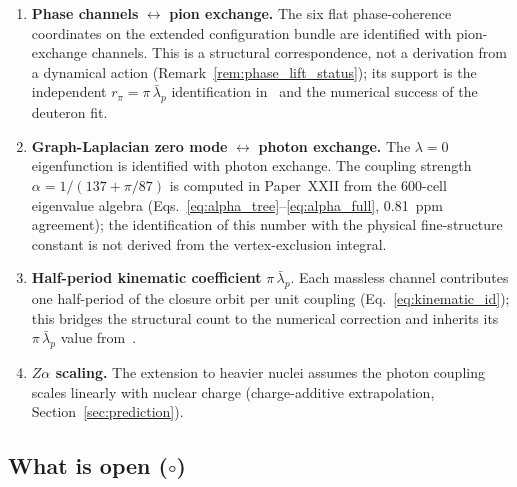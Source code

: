 \documentclass[12pt]{article}
\newcommand{\lbar}{\bar{\lambda}}
\begin{document}
\begin{enumerate}
    \item \textbf{Phase channels} $\leftrightarrow$ \textbf{pion exchange.} The six flat phase-coherence coordinates on the extended configuration bundle are identified with pion-exchange channels. This is a structural correspondence, not a derivation from a dynamical action (Remark~\ref{rem:phase_lift_status}); its support is the independent $r_\pi = \pi\,\lbar_p$ identification in~\citep{SmartRadius} and the numerical success of the deuteron fit.
    \item \textbf{Graph-Laplacian zero mode} $\leftrightarrow$ \textbf{photon exchange.} The $\lambda = 0$ eigenfunction is identified with photon exchange. The coupling strength $\alpha = 1/(137 + \pi/87)$ is computed in Paper~XXII from the 600-cell eigenvalue algebra (Eqs.~\ref{eq:alpha_tree}--\ref{eq:alpha_full}, 0.81~ppm agreement); the identification of this number with the physical fine-structure constant is not derived from the vertex-exclusion integral.
    \item \textbf{Half-period kinematic coefficient} $\pi\,\lbar_p$. Each massless channel contributes one half-period of the closure orbit per unit coupling (Eq.~\ref{eq:kinematic_id}); this bridges the structural count to the numerical correction and inherits its $\pi\,\lbar_p$ value from~\citep{SmartRadius}.
    \item \textbf{$Z\alpha$ scaling.} The extension to heavier nuclei assumes the photon coupling scales linearly with nuclear charge (charge-additive extrapolation, Section~\ref{sec:prediction}).
\end{enumerate}

\subsection{What is open ($\circ$)}
\end{document}
